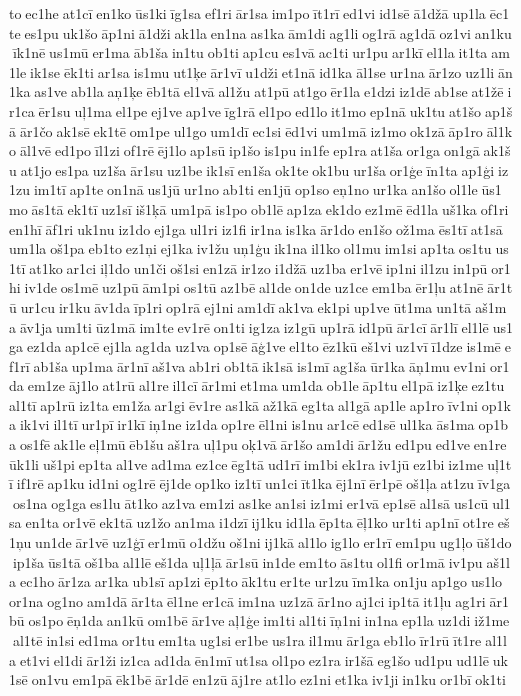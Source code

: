 to ec1he at1cī en1ko ūs1ki īg1sa ef1ri ār1sa im1po īt1rī ed1vi id1sē ā1džā up1la ēc1te es1pu uk1šo āp1ni ā1dži ak1la en1na as1ka ām1di ag1li og1rā ag1dā oz1vi an1ku īk1nē us1mū er1ma āb1ša in1tu ob1ti ap1cu es1vā ac1ti ur1pu ar1kī el1la it1ta am1le ik1se ēk1ti ar1sa is1mu ut1ķe ār1vī u1dži et1nā id1ka āl1se ur1na ār1zo uz1li ān1ka as1ve ab1la aņ1ķe ēb1tā el1vā al1žu at1pū at1go ēr1la e1dzi iz1dē ab1se at1žē ir1ca ēr1su uļ1ma el1pe ej1ve ap1ve īg1rā el1po ed1lo it1mo ep1nā uk1tu at1šo ap1šā ār1čo ak1sē ek1tē om1pe ul1go um1dī ec1si ēd1vi um1mā iz1mo ok1zā āp1ro āl1ko āl1vē ed1po īl1zi of1rē ēj1lo ap1sū ip1šo is1pu in1fe ep1ra at1ša or1ga on1gā ak1šu at1jo es1pa uz1ša ār1su uz1be ik1sī en1ša ok1te ok1bu ur1ša or1ģe īn1ta ap1ģi iz1zu im1tī ap1te on1nā us1jū ur1no ab1ti en1jū op1so eņ1no ur1ka an1šo ol1le ūs1mo ās1tā ek1tī uz1sī iš1ķā um1pā is1po ob1lē ap1za ek1do ez1mē ēd1la uš1ka of1ri en1hī āf1ri uk1nu iz1do ej1ga ul1ri iz1fi ir1na is1ka ār1do en1šo ož1ma ēs1tī at1sā um1la oš1pa eb1to ez1ņi ej1ka iv1žu uņ1ģu ik1na il1ko ol1mu im1si ap1ta os1tu us1tī at1ko ar1ci iļ1do un1či oš1si en1zā ir1zo i1džā uz1ba er1vē ip1ni il1zu in1pū or1hi iv1de os1mē uz1pū ām1pi os1tū az1bē al1de on1de uz1ce em1ba ēr1ļu at1nē ār1tū ur1cu ir1ku āv1da īp1ri op1rā ej1ni am1dī ak1va ek1pi up1ve ūt1ma un1tā aš1ma āv1ja um1ti ūz1mā im1te ev1rē on1ti ig1za iz1gū up1rā id1pū ār1cī ār1lī el1lē us1ga ez1da ap1cē ej1la ag1da uz1va op1sē āģ1ve el1to ēz1kū eš1vi uz1vī ī1dze is1mē ef1rī ab1ša up1ma ār1nī aš1va ab1ri ob1tā ik1sā is1mī ag1ša ūr1ka āņ1mu ev1ni or1da em1ze āj1lo at1rū al1re il1cī ār1mi et1ma um1da ob1le āp1tu el1pā iz1ķe ez1tu al1tī ap1rū iz1ta em1ža ar1gi ēv1re as1kā až1kā eg1ta al1gā ap1le ap1ro īv1ni op1ka ik1vi il1tī ur1pī ir1kī iņ1ne iz1da op1re ēl1ni is1nu ar1cē ed1sē ul1ka ās1ma op1ba os1fē ak1le eļ1mū ēb1šu aš1ra uļ1pu oķ1vā ār1šo am1di ār1žu ed1pu ed1ve en1re ūk1li uš1pi ep1ta al1ve ad1ma ez1ce ēg1tā ud1rī im1bi ek1ra iv1jū ez1bi iz1me uļ1tī if1rē ap1ku id1ni og1rē ēj1de op1ko iz1tī un1ci īt1ka ēj1nī ēr1pē oš1ļa at1zu īv1ga os1na og1ga es1lu āt1ko az1va em1zi as1ke an1si iz1mi er1vā ep1sē al1sā us1cū ul1sa en1ta or1vē ek1tā uz1žo an1ma i1dzī ij1ku id1la ēp1ta ēļ1ko ur1ti ap1nī ot1re eš1ņu un1de ār1vē uz1ģī er1mū o1džu oš1ni ij1kā al1lo ig1lo er1rī em1pu ug1ļo ūš1do ip1ša ūs1tā oš1ba al1lē eš1da uļ1ļā ār1sū in1de em1to ās1tu ol1fi or1mā iv1pu aš1la ec1ho ār1za ar1ka ub1sī ap1zi ēp1to āk1tu er1te ur1zu īm1ka on1ju ap1go us1lo or1na og1no am1dā ār1ta ēl1ne er1cā im1na uz1zā ār1no aj1ci ip1tā it1ļu ag1ri ār1bū os1po ēņ1da an1kū om1bē ār1ve aļ1ģe im1ti al1ti īņ1ni in1na ep1la uz1di iž1me al1tē in1si ed1ma or1tu em1ta ug1si er1be us1ra il1mu ār1ga eb1lo īr1rū īt1re al1la et1vi el1di ār1ži iz1ca ad1da ēn1mī ut1sa ol1po ez1ra ir1šā eg1šo ud1pu ud1lē uk1sē on1vu em1pā ēk1bē ār1dē en1zū āj1re at1lo ez1ni et1ka iv1ji in1ku or1bī ok1ti 